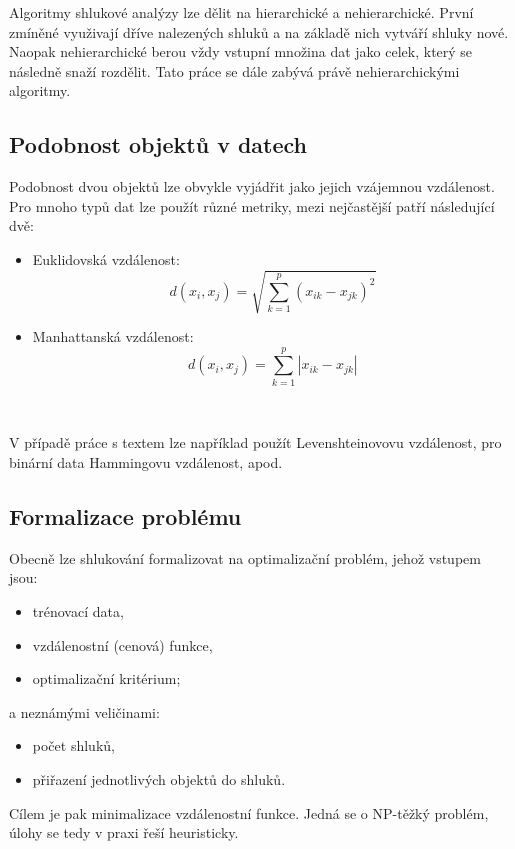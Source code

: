 \documentclass[pdftex,a4paper]{article}
\begin{document}
Algoritmy shlukové analýzy lze dělit na hierarchické a nehierarchické. První zmíněné využivají dříve nalezených shluků a na základě nich vytváří shluky nové. Naopak nehierarchické berou vždy vstupní množina dat jako celek, který se následně snaží rozdělit. Tato práce se dále zabývá právě nehierarchickými algoritmy.



\subsection{Podobnost objektů v datech}

Podobnost dvou objektů lze obvykle vyjádřit jako jejich vzájemnou vzdálenost. Pro mnoho typů dat lze použít různé metriky, mezi nejčastější patří následující dvě:

\begin{itemize}
	\item Euklidovská vzdálenost: \[d(x_i,x_j) = \sqrt{\sum_{k=1}^p (x_{ik}-x_{jk})^2}\]
	\item Manhattanská vzdálenost: \[d(x_i,x_j) = \sum_{k=1}^p \left| x_{ik}-x_{jk} \right|\]
\end{itemize}~

V případě práce s textem lze například použít Levenshteinovovu vzdálenost, pro binární data Hammingovu vzdálenost, apod.



\subsection{Formalizace problému}

Obecně lze shlukování formalizovat na optimalizační problém, jehož vstupem jsou:
\begin{itemize}
	\item trénovací data,
	\item vzdálenostní (cenová) funkce,
	\item optimalizační kritérium;
\end{itemize}

a neznámými veličinami:
\begin{itemize}
	\item počet shluků,
	\item přiřazení jednotlivých objektů do shluků.
\end{itemize}

Cílem je pak minimalizace vzdálenostní funkce. Jedná se o NP-těžký problém, úlohy se tedy v praxi řeší heuristicky.
\end{document}
